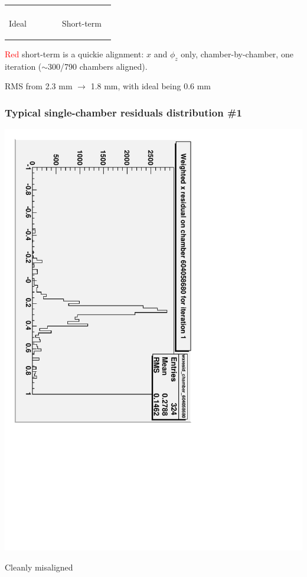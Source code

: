 \documentclass[compress]{beamer}
\begin{document}
\begin{frame}
\begin{center}
\begin{tabular}{p{0.45\linewidth} p{0.45\linewidth}}
\begin{minipage}{\linewidth}
\end{minipage} \\
\begin{minipage}{\linewidth}
\begin{center}
Ideal
\end{center}
\end{minipage} &
\begin{minipage}{\linewidth}
\begin{center}
Short-term
\end{center}
\end{minipage}
\end{tabular}
\end{center}

\vfill \textcolor{red}{Red} short-term is a quickie alignment: $x$ and
$\phi_z$ only, chamber-by-chamber, one iteration ($\sim$300/790 chambers aligned).

\vfill RMS from 2.3 mm $\to$ 1.8 mm, with ideal being 0.6 mm
\end{frame}

\begin{frame}
\frametitle{Typical single-chamber residuals distribution \#1}
\begin{center}
\includegraphics[height=0.7\linewidth, angle=90]{typical_short_deweight_outin.pdf}
\end{center}

\vfill
Cleanly misaligned
\end{frame}
\end{document}
